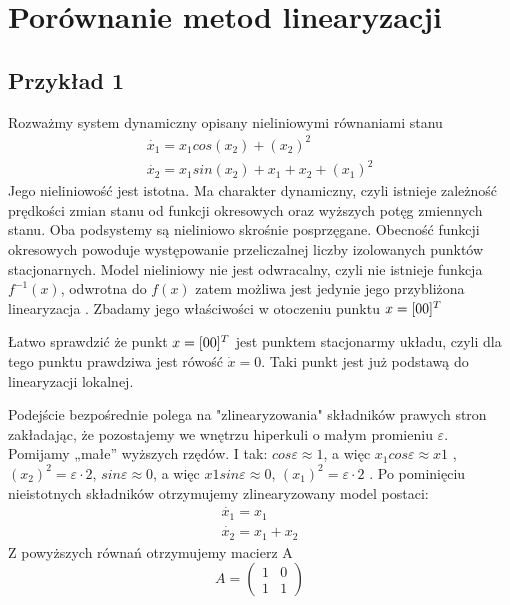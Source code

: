 \documentclass{article}
\begin{document}
	\maketitle
	\section{Porównanie metod linearyzacji}
		\subsection{Przykład 1}
			Rozważmy system dynamiczny opisany nieliniowymi równaniami stanu
			\begin{align*}
				\dot{x_1} = x_1 cos(x_2) + (x_2)^2 \\
				\dot{x_2} = x_1 sin(x_2) + x_1 + x_2 + (x_1)^2 
			\end{align*}
			Jego nieliniowość jest istotna. Ma charakter dynamiczny, czyli istnieje zależność
			prędkości zmian stanu od
			funkcji okresowych oraz wyższych potęg zmiennych stanu. Oba podsystemy są nieliniowo
			skrośnie posprzęgane. Obecność funkcji okresowych powoduje
			występowanie przeliczalnej liczby izolowanych punktów stacjonarnych. Model
			nieliniowy nie jest odwracalny, czyli nie istnieje funkcja $f^{-1}(x)$,
			odwrotna do $f(x)$
			zatem możliwa jest jedynie jego przybliżona linearyzacja . Zbadamy jego właściwości w
			otoczeniu punktu $x = [ 0 \space 0 ]^T $
			
			Łatwo sprawdzić że punkt $x = [ 0 \space  0 ]^T$  jest punktem stacjonarmy układu, czyli
			dla tego punktu prawdziwa jest rówość $\dot{x} = 0$. Taki punkt jest już podstawą
			do linearyzacji lokalnej.

			Podejście bezpośrednie polega na "zlinearyzowania" składników prawych stron zakładając, że
			pozostajemy we wnętrzu hiperkuli o małym promieniu $\varepsilon$. Pomijamy „małe” wyższych
			rzędów. I tak: $cos \varepsilon \approx 1$, a więc $x_1 cos \varepsilon \approx x1$
			, $(x_2)^2 = \varepsilon \cdot 2$, $sin \varepsilon \approx 0$, a więc $x1 sin \varepsilon \approx 0$, $(x_1)^2 = \varepsilon \cdot 2$ .
			Po pominięciu nieistotnych składników otrzymujemy zlinearyzowany model postaci:
			\begin{align*}
				\dot{x_1} = x_1 \\
				\dot{x_2} = x_1 + x_2 
			\end{align*}
			Z powyższych równań otrzymujemy macierz A
			\begin{equation}
				A = 
				\begin{pmatrix}
					1 & 0 \\
					1 & 1 
				\end{pmatrix}
			\end{equation}
\end{document}
